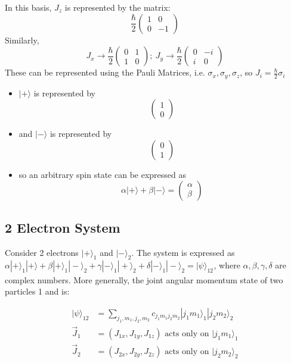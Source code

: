 \documentclass[a4paper,11pt,normalem]{article}
\begin{document}
In this basis, \(J_z\) is represented by the matrix:
\[
    \frac{\hbar}{2}\begin{pmatrix} 1 & 0 \\ 0 & -1 \end{pmatrix}
\]
Similarly,
\[
    J_x \to \frac{\hbar}{2}\begin{pmatrix} 0 & 1 \\ 1 & 0 \end{pmatrix};~ J_y \to \frac{\hbar}{2}\begin{pmatrix} 0 & -i \\ i & 0 \end{pmatrix}
\]
These can be represented using the Pauli Matrices, i.e.
\(\sigma_x,\sigma_y,\sigma_z\), so \(J_i = \frac{\hbar}{2}\sigma_i\)
\begin{itemize}
    \item \(|+\rangle\) is represented by
\[
    \begin{pmatrix} 1 \\ 0 \end{pmatrix}
\]
\item and \(|-\rangle\) is represented by
\[
    \begin{pmatrix} 0 \\ 1 \end{pmatrix}
\]
\item so an arbitrary spin state can be expressed as
\[
    \alpha|+\rangle + \beta|-\rangle = \begin{pmatrix} \alpha \\ \beta \end{pmatrix}
\]
\end{itemize}

\subsection{2 Electron System}\label{electron-system}
Consider 2 electrons \(|+\rangle_1\) and \(|-\rangle_2\). The system is
expressed as
\(\alpha|+\rangle_1|+\rangle + \beta|+\rangle_1|-\rangle_2 + \gamma|-\rangle_1|+\rangle_2 + \delta|-\rangle_1|-\rangle_2 = |\psi\rangle_{12_{}}\),
where \(\alpha,\beta,\gamma,\delta\) are complex numbers. More
generally, the joint angular momentum state of two particles 1 and is:

\[
    \begin{aligned}
    |\psi\rangle_{12} &= \sum_{j_1,m_1,j_2,m_2} c_{j_1m_1j_2m_2}|j_1m_1\rangle_1|j_2m_2\rangle_2 \\
    \vec{J}_1 &= (J_{1x},J_{1y},J_{1z}) \text{ acts only on } |j_1m_1\rangle_1 \\
    \vec{J}_2 &= (J_{2x},J_{2y},J_{2z}) \text{ acts only on } |j_2m_2\rangle_2
    \end{aligned}
\]
\end{document}
